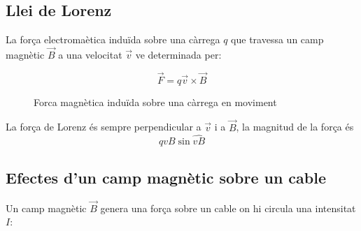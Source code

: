 \subsection{Llei de Lorenz}
\label{sub:llei_de_lorenz}

La força electromaètica induïda sobre una càrrega $q$ que travessa un camp magnètic $\vec{B}$ a una velocitat $\vec{v}$ ve determinada per:

\begin{equation}
    \vec{F} = q\vec{v}\times \vec{B}
\end{equation}

\begin{figure}[H]
    \centering
    \caption{Forca magnètica induïda sobre una càrrega en moviment}
    \label{fig:fem_induida}
\end{figure}

La força de Lorenz és sempre perpendicular a $\vec{v}$ i a $\vec{B}$, la magnitud de la força és 
\begin{equation}
    qvB\sin\widehat{vB}
\end{equation}

\subsection{Efectes d'un camp magnètic sobre un cable}
\label{sub:efectes_d_un_camp_magnetic_sobre_un_cable}

Un camp magnètic $\vec{B}$ genera una força sobre un cable on hi circula una
intensitat $I$:

